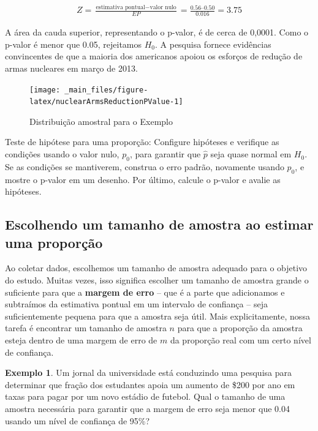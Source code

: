 \documentclass[
]{book}
\theoremstyle{definition}
\theoremstyle{definition}
\newtheorem{example}{Exemplo}[chapter]
\theoremstyle{definition}
\theoremstyle{definition}
\theoremstyle{remark}
\begin{document}
\begin{align*}
Z = \frac{\text{estimativa pontual} - \text{valor nulo}}{EP} = \frac{0.56 – 0.50}{0.016} = 3.75
\end{align*}

A área da cauda superior, representando o p-valor, é de cerca de 0,0001. Como o p-valor é menor que 0.05, rejeitamos \(H_0\). A pesquisa fornece evidências convincentes de que a maioria dos americanos apoiou os esforços de redução de armas nucleares em março de 2013.

\begin{figure}
\texttt{[image: \_main\_files/figure-latex/nuclearArmsReductionPValue-1]} \caption{Distribuição amostral para o Exemplo}\label{fig:nuclearArmsReductionPValue}
\end{figure}

Teste de hipótese para uma proporção: Configure hipóteses e verifique as condições usando o valor nulo, \(p_0\), para garantir que \(\hat{p}\) seja quase normal em \(H_0\). Se as condições se mantiverem, construa o erro padrão, novamente usando \(p_0\), e mostre o p-valor em um desenho. Por último, calcule o p-valor e avalie as hipóteses.

\hypertarget{choosingSampleSizeEstimatingProportion}{%
\subsection{Escolhendo um tamanho de amostra ao estimar uma proporção}\label{choosingSampleSizeEstimatingProportion}}

Ao coletar dados, escolhemos um tamanho de amostra adequado para o objetivo do estudo. Muitas vezes, isso significa escolher um tamanho de amostra grande o suficiente para que a \textbf{margem de erro} -- que é a parte que adicionamos e subtraímos da estimativa pontual em um intervalo de confiança -- seja suficientemente pequena para que a amostra seja útil. Mais explicitamente, nossa tarefa é encontrar um tamanho de amostra \(n\) para que a proporção da amostra esteja dentro de uma margem de erro de \(m\) da proporção real com um certo nível de confiança.

\begin{example}
\protect\hypertarget{exm:unnamed-chunk-228}{}{\label{exm:unnamed-chunk-228} }Um jornal da universidade está conduzindo uma pesquisa para determinar que fração dos estudantes apoia um aumento de \$200 por ano em taxas para pagar por um novo estádio de futebol. Qual o tamanho de uma amostra necessária para garantir que a margem de erro seja menor que 0.04 usando um nível de confiança de 95\%?
\end{example}
\end{document}
